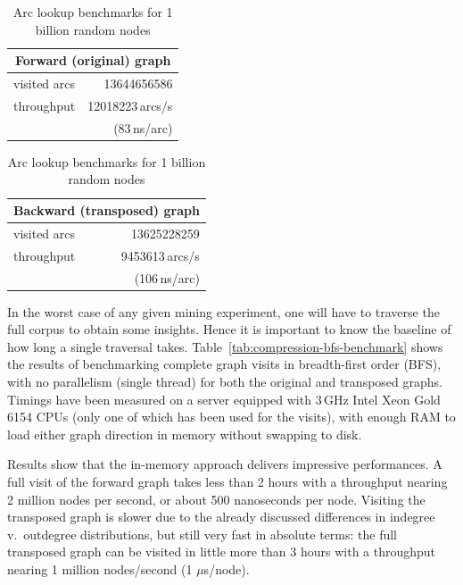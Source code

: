 \begin{table}
  \centering
  \caption{Arc lookup benchmarks for 1 billion random nodes}
  \label{tab:compression-arc-benchmark}


  \hfill
  \begin{tabular}{lr}
    \multicolumn{2}{c}{\textbf{Forward (original) graph}} \\
    \hline\hline
    visited arcs  & \num{13644656586} \\
    throughput    & \num{12018223}\,arcs/s \\
                  & (83\,ns/arc) \\
    \hline
  \end{tabular}
  \hfill
  \begin{tabular}{lr}
    \multicolumn{2}{c}{\textbf{Backward (transposed) graph}} \\
    \hline\hline
    visited arcs  & \num{13625228259} \\
    throughput    & \num{9453613}\,arcs/s \\
                  & (106\,ns/arc) \\
    \hline
  \end{tabular}
  \hfill
\end{table}

In the worst case of any given mining experiment, one will have to traverse the
full corpus to obtain some insights. Hence it is important to know the baseline
of how long a single traversal takes. Table~\ref{tab:compression-bfs-benchmark}
shows the results of benchmarking complete graph visits in breadth-first order
(BFS), with no parallelism (single thread) for both the original and transposed
graphs. Timings have been measured on a server equipped with 3\,GHz Intel Xeon
Gold 6154 CPUs (only one of which has been used for the visits), with enough
RAM to load either graph direction in memory without swapping to disk.

Results show that the in-memory approach delivers impressive performances. A
full visit of the forward graph takes less than 2 hours with a throughput
nearing 2 million nodes per second, or about 500 nanoseconds per node. Visiting
the transposed graph is slower due to the already discussed differences in
indegree v.~outdegree distributions, but still very fast in absolute terms: the
full transposed graph can be visited in little more than 3 hours with a
throughput nearing 1 million nodes/second (1 $\mu$s/node).

